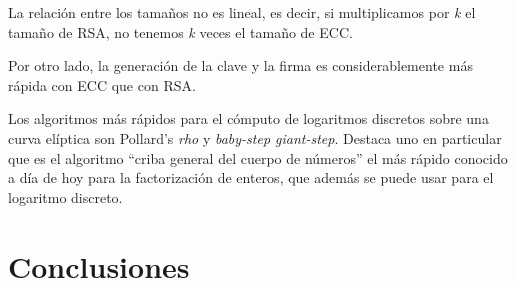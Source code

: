 \documentclass[11pt]{article}
\begin{document}
La relación entre los tamaños no es lineal, es decir, si multiplicamos por \textit{k} el tamaño de RSA, no tenemos \textit{k} veces el tamaño de ECC.

Por otro lado, la generación de la clave y la firma es considerablemente más rápida con ECC que con RSA.

Los algoritmos más rápidos para el cómputo de logaritmos discretos sobre una curva elíptica son Pollard's \textit{rho} y \textit{baby-step giant-step}. Destaca uno en particular que es el algoritmo ``criba general del cuerpo de números'' el más rápido conocido a día de hoy para la factorización de enteros, que además se puede usar para el logaritmo discreto.

\section{Conclusiones}

\newpage
\end{document}
